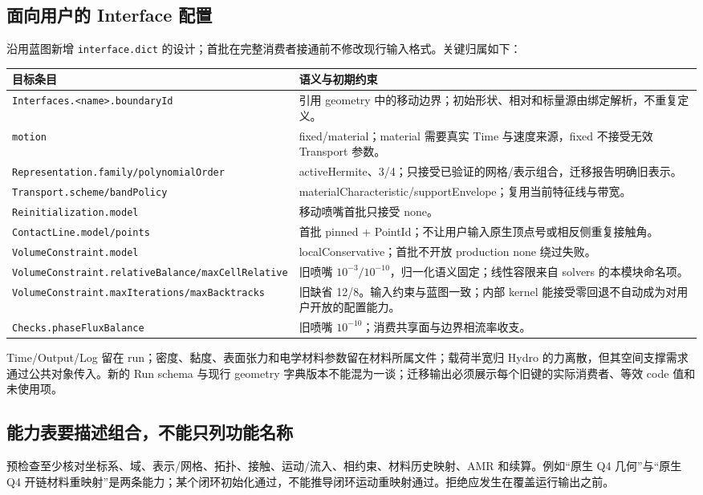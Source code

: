 \documentclass[UTF8,a4paper,11pt,fontset=fandol]{ctexart}
\newcommand{\code}[1]{\nolinkurl{#1}}
\begin{document}
\subsection{面向用户的 Interface 配置}
沿用蓝图新增 \code{interface.dict} 的设计；首批在完整消费者接通前不修改现行输入格式。关键归属如下：
\begin{longtable}{@{}P{.40\textwidth}P{.54\textwidth}@{}}
\toprule 目标条目 & 语义与初期约束\\\midrule\endhead
\code{Interfaces.<name>.boundaryId} & 引用 geometry 中的移动边界；初始形状、相对和标量源由绑定解析，不重复定义。\\
\code{motion} & fixed/material；material 需要真实 Time 与速度来源，fixed 不接受无效 Transport 参数。\\
\code{Representation.family/polynomialOrder} & activeHermite、3/4；只接受已验证的网格/表示组合，迁移报告明确旧表示。\\
\code{Transport.scheme/bandPolicy} & materialCharacteristic/supportEnvelope；复用当前特征线与带宽。\\
\code{Reinitialization.model} & 移动喷嘴首批只接受 none。\\
\code{ContactLine.model/points} & 首批 pinned + PointId；不让用户输入原生顶点号或相反侧重复接触角。\\
\code{VolumeConstraint.model} & localConservative；首批不开放 production none 绕过失败。\\
\code{VolumeConstraint.relativeBalance/maxCellRelative} & 旧喷嘴 $10^{-3}/10^{-10}$，归一化语义固定；线性容限来自 solvers 的本模块命名项。\\
\code{VolumeConstraint.maxIterations/maxBacktracks} & 旧缺省 12/8。输入约束与蓝图一致；内部 kernel 能接受零回退不自动成为对用户开放的配置能力。\\
\code{Checks.phaseFluxBalance} & 旧喷嘴 $10^{-10}$；消费共享面与边界相流率收支。\\
\bottomrule
\end{longtable}
Time/Output/Log 留在 run；密度、黏度、表面张力和电学材料参数留在材料所属文件；载荷半宽归 Hydro 的力离散，但其空间支撑需求通过公共对象传入。新的 Run schema 与现行 geometry 字典版本不能混为一谈；迁移输出必须展示每个旧键的实际消费者、等效 code 值和未使用项。

\subsection{能力表要描述组合，不能只列功能名称}
预检查至少核对坐标系、域、表示/网格、拓扑、接触、运动/流入、相约束、材料历史映射、AMR 和续算。例如“原生 Q4 几何”与“原生 Q4 开链材料重映射”是两条能力；某个闭环初始化通过，不能推导闭环运动重映射通过。拒绝应发生在覆盖运行输出之前。
\end{document}
